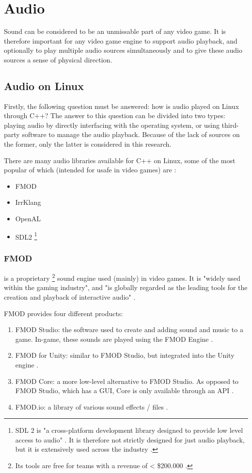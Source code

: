\documentclass{article} %
\begin{document}
\newpage

\section{Audio}
Sound can be considered to be an unmissable part of any video game. It is therefore important for any video game engine to
support audio playback, and optionally to play multiple audio sources simultaneously and to give these audio sources a sense of physical direction.
\subsection{Audio on Linux}
Firstly, the following question must be answered: how is audio played on Linux through C++? The answer to this question can be divided into two types:
playing audio by directly interfacing with the operating system, or using third-party software to manage the audio playback.
Because of the lack of sources on the former, only the latter is considered in this research.

There are many audio libraries available for C++ on Linux, some of the most popular of which (intended for usafe in video games) are \cite{Szanto_2018}:
\begin{itemize}
	\item FMOD
	\item IrrKlang
	\item OpenAL
	\item SDL2 \footnote{SDL 2 is "a cross-platform development library designed to provide low level access to audio" \cite{sdl2}. It is therefore not strictly designed for just audio playback, but it is extensively used across the industry \cite{sdl2games}.}
\end{itemize}

\subsubsection{FMOD} is a proprietary \footnote{Its tools are free for teams with a revenue of < \$200.000 \cite{fmodStudio}.} sound engine used (mainly) in video games.
It is "widely used within the gaming industry", and "is globally regarded as the leading tools for the creation and playback of interactive audio" \cite{dolbyFmod}.

FMOD provides four different products:
\begin{enumerate}
	\item FMOD Studio: the software used to create and adding sound and music to a game. In-game, these sounds are played using the FMOD Engine \cite{fmodStudio}.
	\item FMOD for Unity: similar to FMOD Studio, but integrated into the Unity engine \cite{fmodUnity}.
	\item FMOD Core: a more low-level alternative to FMOD Studio. As opposed to FMOD Studio, which has a GUI, Core is only available through an API \cite{fmodCore}.
	\item FMOD.io: a library of various sound effects / files \cite{fmodIo}.
\end{enumerate}
\end{document}
